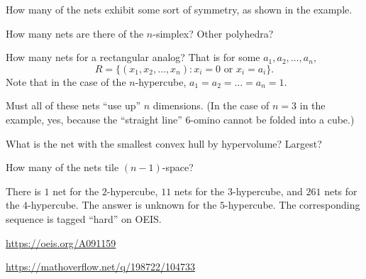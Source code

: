 \documentclass{article}
\begin{document}
\begin{related}
  \item How many of the nets exhibit some sort of symmetry, as shown in the example.
  \item How many nets are there of the $n$-simplex? Other polyhedra?
  \item How many nets for a rectangular analog? That is for some $a_1, a_2, \hdots, a_n$, \[
    R = \{(x_1, x_2, \hdots, x_n) : x_i = 0 \text{ or } x_i = a_i\}.
  \] Note that in the case of the $n$-hypercube, $a_1 = a_2 = \hdots = a_n = 1$.
  \item Must all of these nets ``use up'' $n$ dimensions.
  (In the case of $n=3$ in the example, yes, because the ``straight line''
  $6$-omino cannot be folded into a cube.)
  \item What is the net with the smallest convex hull by hypervolume? Largest?
  \item How many of the nets tile $(n-1)$-space?
\end{related}

\begin{note}
  There is $1$ net for the $2$-hypercube, $11$ nets for the $3$-hypercube,
  and $261$ nets for the $4$-hypercube.
  The answer is unknown for the $5$-hypercube.
  The corresponding sequence is tagged ``hard'' on OEIS.
\end{note}

\begin{references}
  \item \url{https://oeis.org/A091159}
  \item \url{https://mathoverflow.net/q/198722/104733}
\end{references}
\end{document}
